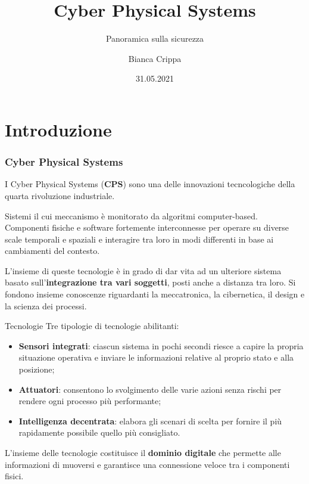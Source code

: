 \documentclass{beamer}
\title{Cyber Physical Systems}
\subtitle{Panoramica sulla sicurezza}
\author{Bianca Crippa}
\institute{Università degli Studi di Bergamo
    \\ \url{https://github.com/Biancolinaa/CPS-presentation.git}
}
\date{31.05.2021}
\begin{document}
\frame{\titlepage}


\section{Introduzione}

\begin{frame}
    \frametitle{Cyber Physical Systems}
    I Cyber Physical Systems (\textbf{CPS}) sono una delle innovazioni tecncologiche della quarta rivoluzione industriale.
    
    Sistemi il cui meccanismo è monitorato da algoritmi computer-based. 
    Componenti fisiche e software fortemente interconnesse per operare su diverse scale temporali e spaziali e  
    interagire tra loro in modi differenti in base ai cambiamenti del contesto. 

    L'insieme di queste tecnologie è in grado di dar vita ad un ulteriore sistema basato sull'\textbf{integrazione tra vari soggetti}, posti anche a 
    distanza tra loro.    
    Si fondono insieme conoscenze riguardanti la meccatronica, la cibernetica, il design e la scienza dei processi.
    
\end{frame}

\begin{frame}{Tecnologie}
Tre tipologie di tecnologie abilitanti:
\begin{itemize}
    \item \textbf{Sensori integrati}: ciascun sistema in pochi secondi riesce a capire la propria situazione operativa e inviare le informazioni relative al 
    proprio stato e alla posizione;
    \item \textbf{Attuatori}: consentono lo svolgimento delle varie azioni senza rischi per rendere ogni processo più performante;
    \item \textbf{Intelligenza decentrata}: elabora gli scenari di scelta per fornire il più rapidamente possibile quello più consigliato.
\end{itemize}

L'insieme delle tecnologie costituisce il \textbf{dominio digitale} che permette alle informazioni di muoversi e garantisce una connessione veloce tra i 
componenti fisici.

\end{frame}
\end{document}
